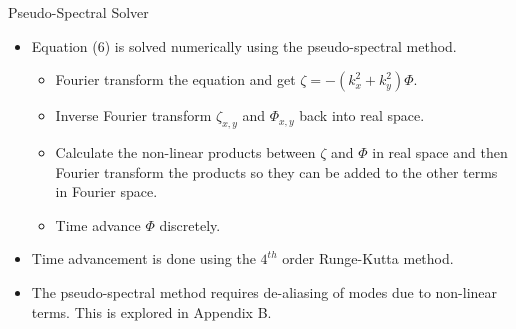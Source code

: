 \documentclass[aspectratio=43]{beamer}
\begin{document}
   \begin{frame}{Pseudo-Spectral Solver}
      \begin{itemize}
         \item Equation (6) is solved numerically using the pseudo-spectral method.
            \begin{itemize}
               \item Fourier transform the equation and get $\zeta=-(k_x^2 + k_y^2)\Phi$.
               \item Inverse Fourier transform $\zeta_{x,y}$ and $\Phi_{x,y}$ back into real space.
               \item Calculate the non-linear products between $\zeta$ and $\Phi$ in real space and then Fourier transform the
               products so they can be added to the other terms in Fourier space.
               \item Time advance $\Phi$ discretely.
            \end{itemize}
         \vspace{5mm}
         \item Time advancement is done using the $4^{th}$ order Runge-Kutta method.
         \vspace{5mm}
         \item The pseudo-spectral method requires de-aliasing of modes due to non-linear terms. This is explored in Appendix B.
      \end{itemize}
   \end{frame}
\end{document}
